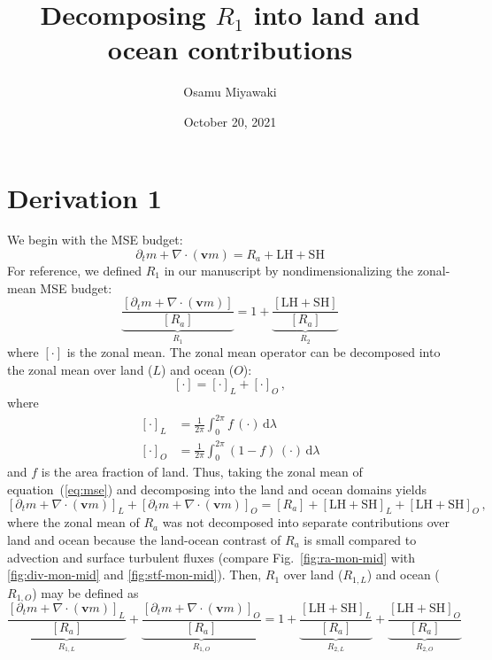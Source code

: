 \documentclass{article}
\title{Decomposing $R_1$ into land and ocean contributions}
\date{October 20, 2021}
\author{Osamu Miyawaki}
\begin{document}
\maketitle

\section*{Derivation 1}
We begin with the MSE budget:
\begin{equation}\label{eq:mse}
    \partial_t m + \nabla\cdot (\mathbf{v}m) = R_a + \mathrm{LH+SH}
\end{equation}
For reference, we defined $R_1$ in our manuscript by nondimensionalizing the zonal-mean MSE budget:
\begin{equation}\label{eq:msez}
    \underbrace{\frac{[\partial_t m + \nabla\cdot (\mathbf{v}m)]}{[R_a]}}_{R_1} = 1 + \underbrace{\frac{\mathrm{[LH+SH]}}{[R_a]}}_{R_2}
\end{equation}
where $[\cdot]$ is the zonal mean. The zonal mean operator can be decomposed into the zonal mean over land ($L$) and ocean ($O$):
\begin{equation}\label{eq:z}
    [\cdot] = [\cdot]_L + [\cdot]_O \, ,
\end{equation}
where
\begin{align}\label{eq:loavg}
    [\cdot]_L &= \frac{1}{2\pi}\int_0^{2\pi} \! f\,(\cdot) \, \mathrm{d}\lambda \\
    [\cdot]_O &= \frac{1}{2\pi}\int_0^{2\pi} \! (1-f)\,(\cdot) \, \mathrm{d}\lambda 
\end{align}
and $f$ is the area fraction of land. Thus, taking the zonal mean of equation~(\ref{eq:mse}) and decomposing into the land and ocean domains yields
\begin{equation}\label{eq:msezlo}
    [\partial_t m + \nabla\cdot (\mathbf{v}m)]_L + [\partial_t m + \nabla\cdot (\mathbf{v}m)]_O = [R_a] + [\mathrm{LH+SH}]_L+ [\mathrm{LH+SH}]_O \, ,
\end{equation}
where the zonal mean of $R_a$ was not decomposed into separate contributions over land and ocean because the land-ocean contrast of $R_a$ is small compared to advection and surface turbulent fluxes (compare Fig.~\ref{fig:ra-mon-mid} with \ref{fig:div-mon-mid} and \ref{fig:stf-mon-mid}). Then, $R_1$ over land ($R_{1,L}$) and ocean ($R_{1,O}$) may be defined as
\begin{equation}\label{eq:r1zlo}
    \underbrace{\frac{[\partial_t m + \nabla\cdot (\mathbf{v}m)]_L}{[R_a]}}_{R_{1,L}} + \underbrace{\frac{[\partial_t m + \nabla\cdot (\mathbf{v}m)]_O}{[R_a]}}_{R_{1,O}} = 1 + \underbrace{\frac{[\mathrm{LH+SH}]_L}{[R_a]}}_{R_{2,L}} + \underbrace{\frac{[\mathrm{LH+SH}]_O}{[R_a]}}_{R_{2,O}}
\end{equation}
\end{document}

